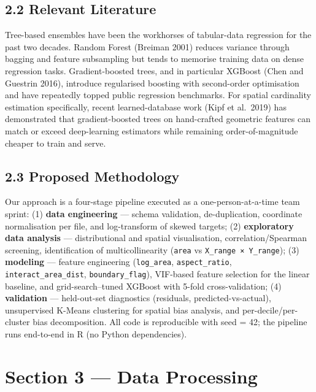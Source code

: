 \documentclass[
  10pt,
  twocolumn,
  10pt]{article}
\begin{document}
\subsection{2.2 Relevant Literature}\label{relevant-literature}

Tree-based ensembles have been the workhorses of tabular-data regression
for the past two decades. Random Forest (Breiman 2001) reduces variance
through bagging and feature subsampling but tends to memorise training
data on dense regression tasks. Gradient-boosted trees, and in
particular XGBoost (Chen and Guestrin 2016), introduce regularised
boosting with second-order optimisation and have repeatedly topped
public regression benchmarks. For spatial cardinality estimation
specifically, recent learned-database work (Kipf et al.~2019) has
demonstrated that gradient-boosted trees on hand-crafted geometric
features can match or exceed deep-learning estimators while remaining
order-of-magnitude cheaper to train and serve.

\subsection{2.3 Proposed Methodology}\label{proposed-methodology}

Our approach is a four-stage pipeline executed as a one-person-at-a-time
team sprint: (1) \textbf{data engineering} --- schema validation,
de-duplication, coordinate normalisation per file, and log-transform of
skewed targets; (2) \textbf{exploratory data analysis} ---
distributional and spatial visualisation, correlation/Spearman
screening, identification of multicollinearity (\texttt{area} vs
\texttt{X\_range\ ×\ Y\_range}); (3) \textbf{modeling} --- feature
engineering (\texttt{log\_area}, \texttt{aspect\_ratio},
\texttt{interact\_area\_dist}, \texttt{boundary\_flag}), VIF-based
feature selection for the linear baseline, and grid-search--tuned
XGBoost with 5-fold cross-validation; (4) \textbf{validation} ---
held-out-set diagnostics (residuals, predicted-vs-actual), unsupervised
K-Means clustering for spatial bias analysis, and per-decile/per-cluster
bias decomposition. All code is reproducible with seed = 42; the
pipeline runs end-to-end in R (no Python dependencies).

\section{Section 3 --- Data Processing}\label{section-3-data-processing}
\end{document}
